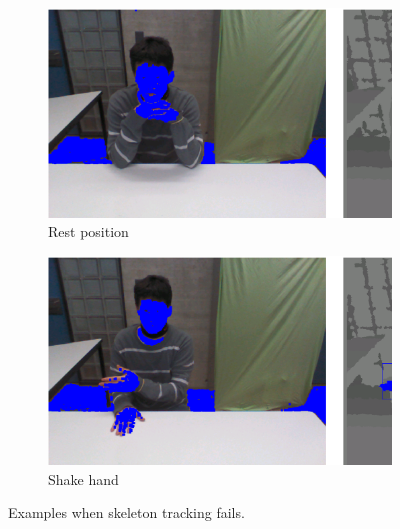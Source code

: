 \documentclass{sig-alternate}
\begin{document}
\begin{figure}
\centering
\begin{subfigure}{0.485\textwidth}
  \centering
  \includegraphics[height=0.35\columnwidth]{fig/rest.ps}
  \caption{Rest position}
\end{subfigure}
\begin{subfigure}{0.485\textwidth}
  \centering
  \includegraphics[height=0.35\columnwidth]{fig/shakehand.ps}
  \caption{Shake hand}
\end{subfigure}
\caption{Examples when skeleton tracking fails.}
\label{fig:skin}
\end{figure}
\end{document}
